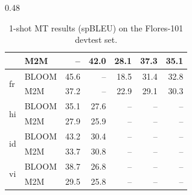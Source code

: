 \documentclass[twoside,11pt]{article}
\begin{document}
\begin{table}[!ht]
\begin{subtable}[b]{0.48\textwidth}
{\begin{tabular}{llrrrrr}
 & M2M & -- & 42.0 & 28.1 & 37.3 & 35.1 \\
\midrule
\multirow{2}{*}{fr} & BLOOM & 45.6 & -- & 18.5 & 31.4 & 32.8 \\
 & M2M & 37.2 & -- & 22.9 & 29.1 & 30.3 \\
\midrule
\multirow{2}{*}{hi} & BLOOM & 35.1 & 27.6 & -- & -- & -- \\
 & M2M & 27.9 & 25.9 & -- & -- & -- \\
\midrule
\multirow{2}{*}{id} & BLOOM & 43.2 & 30.4 & -- & -- & -- \\
 & M2M & 33.7 & 30.8 & -- & -- & -- \\
\midrule
\multirow{2}{*}{vi} & BLOOM & 38.7 & 26.8 & -- & -- & -- \\
 & M2M & 29.5 & 25.8 & -- & -- & -- \\
  \bottomrule
\end{tabular}}
\caption{High$\rightarrow$mid-resource language pairs.}
\label{tab:flores101:high-mid}
\end{subtable}
\caption{\label{tab:flores-results}1-shot MT results (spBLEU) on the Flores-101 devtest set. }
\end{table}
\end{document}
